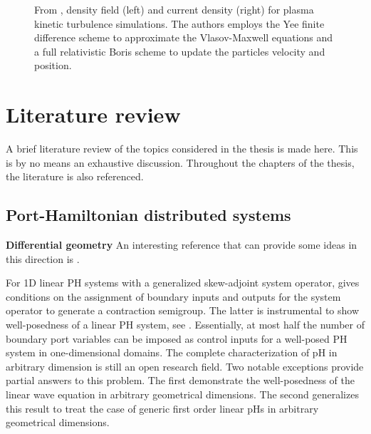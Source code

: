 \begin{figure}[htbp]%
	\centering
	\hspace{8pt}%
	\caption[]{From \cite{nattila2019runko}, density field (left) and current density (right) for plasma kinetic turbulence simulations. The authors employs the Yee finite difference scheme \cite{yee1966numerical} to approximate the Vlasov-Maxwell equations and a full relativistic Boris scheme \cite{boris1970relativistic} to update the particles velocity and position.}%
	\label{fig:plasma}%
\end{figure}

\section{Literature review}
A brief literature review of the topics considered in the thesis is made here. This is by no means an exhaustive discussion. Throughout the chapters of the thesis, the literature is also referenced.


\subsection{Port-Hamiltonian distributed systems}
\textbf{Differential geometry}
An interesting reference that can provide some ideas in this direction is \cite{yao2011modeling,nishida2004}. 

For 1D linear PH systems with a generalized skew-adjoint system operator, \cite{legorrec2005} gives conditions on the assignment of boundary inputs and outputs for the system operator to generate a contraction semigroup. The latter is instrumental to show well-posedness of a linear PH system, see \cite{zwart2012}. Essentially, at most half the number of boundary port variables
can be imposed as control inputs for a well-posed PH system in one-dimensional domains. The complete characterization of pH in arbitrary dimension is still an open research field. Two notable exceptions \cite{zwart2015wave,skrepek2019wellposedness} provide partial answers to this problem. The first demonstrate the well-posedness of the linear wave equation in arbitrary geometrical dimensions. The second generalizes this result to treat the case of generic first order linear pHs in arbitrary geometrical dimensions. \\


